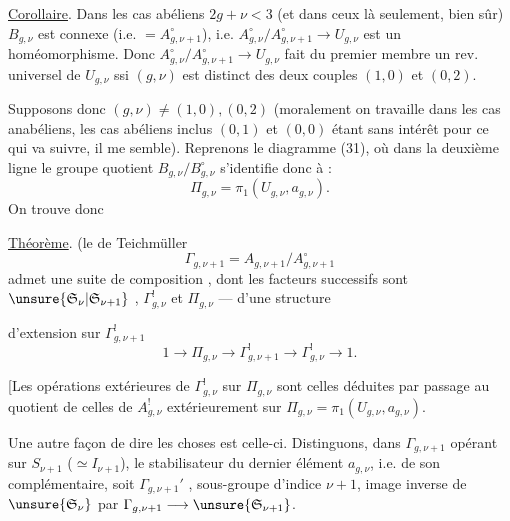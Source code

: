 \uline{Corollaire}. Dans les cas abéliens $2g+\nu<3$ (et dans ceux là seulement, bien sûr) $B_{g,\nu}$ est connexe (i.e. $=A_{g,\nu+1}^{\circ}$), i.e. $A_{g,\nu}^{\circ}/A_{g,\nu+1}^{\circ}\longrightarrow U_{g,\nu}$ est un homéomorphisme. Donc $A_{g,\nu}^{\circ}/A_{g,\nu+1}^{\circ}\longrightarrow U_{g,\nu}$ fait du premier membre un rev. universel de $U_{g,\nu}$ ssi $(g,\nu)$ est distinct des deux couples $(1,0)$ et $(0,2)$.

Supposons donc $(g,\nu)\ne(1,0),(0,2)$ (moralement on travaille dans les cas anabéliens, les cas  abéliens inclus $(0,1)$ et $(0,0)$ étant  sans intérêt pour ce qui va suivre, il me semble). Reprenons le diagramme (31), où dans la deuxième ligne le groupe quotient $B_{g,\nu}/B_{g,\nu}^{\circ}$ s'identifie donc à :
\[
\Pi_{g,\nu}=\pi_1(U_{g,\nu},a_{g,\nu}).
\]
On trouve donc

\uline{Théorème}.  (le   de Teichmüller
\[
\Gamma_{g,\nu+1}=A_{g,\nu+1}/A_{g,\nu+1}^{\circ}
\]
admet une suite de composition , dont les facteurs successifs sont $\unsure{\mathfrak S_\nu|\mathfrak S_{\nu+1}}$ , $\Gamma_{g,\nu}^{!}$ et $\Pi_{g,\nu}$ ---  d'une structure

d'extension sur $\Gamma_{g,\nu+1}^{!}$
\[
\tag{41}
1\longrightarrow\Pi_{g,\nu}\longrightarrow\Gamma_{g,\nu+1}^{!}
\longrightarrow\Gamma_{g,\nu}^{!}\longrightarrow1.
\]

[Les opérations extérieures de $\Gamma_{g,\nu}^{!}$ sur $\Pi_{g,\nu}$ sont celles déduites par passage au quotient de celles de $A_{g,\nu}^{!}$   extérieurement sur $\Pi_{g,\nu}=\pi_1(U_{g,\nu},a_{g,\nu})$.

Une autre façon de dire les choses est celle-ci. Distinguons, dans $\Gamma_{g,\nu+1}$ opérant sur $S_{\nu+1}$  ($\simeq I_{\nu+1}$), le stabilisateur du dernier élément $a_{g,\nu}$, i.e. de son complémentaire, soit $\Gamma_{g,\nu+1}'$ ,  sous-groupe d'indice $\nu+1$, image inverse de $\unsure{\mathfrak S_\nu}$  par $\Gamma_{g,\nu+1}\longrightarrow\unsure{\mathfrak S_{\nu+1}}$.

